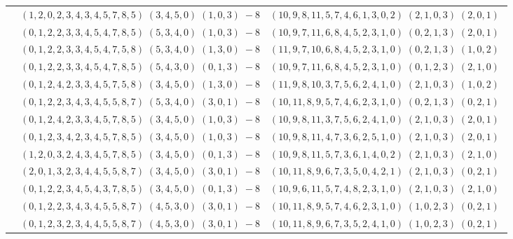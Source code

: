 \documentclass[11pt]{article}
\begin{document}
\begin{longtable}[l]{|c|c|c|}
 \cline{2-3} 
 & $(1 ,2 ,0 ,2 ,3 ,4 ,3 ,4 ,5 ,7 ,8 ,5) \;(3 ,4 ,5 ,0) \;(1 ,0 ,3) \;-8$ & $(10 ,9 ,8 ,11 ,5 ,7 ,4 ,6 ,1 ,3 ,0 ,2) \;(2 ,1 ,0 ,3) \;(2 ,0 ,1) \;$\\ 
 \cline{2-3} 
 & $(0 ,1 ,2 ,2 ,3 ,3 ,4 ,5 ,4 ,7 ,8 ,5) \;(5 ,3 ,4 ,0) \;(1 ,0 ,3) \;-8$ & $(10 ,9 ,7 ,11 ,6 ,8 ,4 ,5 ,2 ,3 ,1 ,0) \;(0 ,2 ,1 ,3) \;(2 ,0 ,1) \;$\\ 
 \cline{2-3} 
 & $(0 ,1 ,2 ,2 ,3 ,3 ,4 ,5 ,4 ,7 ,5 ,8) \;(5 ,3 ,4 ,0) \;(1 ,3 ,0) \;-8$ & $(11 ,9 ,7 ,10 ,6 ,8 ,4 ,5 ,2 ,3 ,1 ,0) \;(0 ,2 ,1 ,3) \;(1 ,0 ,2) \;$\\ 
 \cline{2-3} 
 & $(0 ,1 ,2 ,2 ,3 ,3 ,4 ,5 ,4 ,7 ,8 ,5) \;(5 ,4 ,3 ,0) \;(0 ,1 ,3) \;-8$ & $(10 ,9 ,7 ,11 ,6 ,8 ,4 ,5 ,2 ,3 ,1 ,0) \;(0 ,1 ,2 ,3) \;(2 ,1 ,0) \;$\\ 
 \cline{2-3} 
 & $(0 ,1 ,2 ,4 ,2 ,3 ,3 ,4 ,5 ,7 ,5 ,8) \;(3 ,4 ,5 ,0) \;(1 ,3 ,0) \;-8$ & $(11 ,9 ,8 ,10 ,3 ,7 ,5 ,6 ,2 ,4 ,1 ,0) \;(2 ,1 ,0 ,3) \;(1 ,0 ,2) \;$\\ 
 \cline{2-3} 
 & $(0 ,1 ,2 ,2 ,3 ,4 ,3 ,4 ,5 ,5 ,8 ,7) \;(5 ,3 ,4 ,0) \;(3 ,0 ,1) \;-8$ & $(10 ,11 ,8 ,9 ,5 ,7 ,4 ,6 ,2 ,3 ,1 ,0) \;(0 ,2 ,1 ,3) \;(0 ,2 ,1) \;$\\ 
 \cline{2-3} 
 & $(0 ,1 ,2 ,4 ,2 ,3 ,3 ,4 ,5 ,7 ,8 ,5) \;(3 ,4 ,5 ,0) \;(1 ,0 ,3) \;-8$ & $(10 ,9 ,8 ,11 ,3 ,7 ,5 ,6 ,2 ,4 ,1 ,0) \;(2 ,1 ,0 ,3) \;(2 ,0 ,1) \;$\\ 
 \cline{2-3} 
 & $(0 ,1 ,2 ,3 ,4 ,2 ,3 ,4 ,5 ,7 ,8 ,5) \;(3 ,4 ,5 ,0) \;(1 ,0 ,3) \;-8$ & $(10 ,9 ,8 ,11 ,4 ,7 ,3 ,6 ,2 ,5 ,1 ,0) \;(2 ,1 ,0 ,3) \;(2 ,0 ,1) \;$\\ 
 \cline{2-3} 
 & $(1 ,2 ,0 ,3 ,2 ,4 ,3 ,4 ,5 ,7 ,8 ,5) \;(3 ,4 ,5 ,0) \;(0 ,1 ,3) \;-8$ & $(10 ,9 ,8 ,11 ,5 ,7 ,3 ,6 ,1 ,4 ,0 ,2) \;(2 ,1 ,0 ,3) \;(2 ,1 ,0) \;$\\ 
 \cline{2-3} 
 & $(2 ,0 ,1 ,3 ,2 ,3 ,4 ,4 ,5 ,5 ,8 ,7) \;(3 ,4 ,5 ,0) \;(3 ,0 ,1) \;-8$ & $(10 ,11 ,8 ,9 ,6 ,7 ,3 ,5 ,0 ,4 ,2 ,1) \;(2 ,1 ,0 ,3) \;(0 ,2 ,1) \;$\\ 
 \cline{2-3} 
 & $(0 ,1 ,2 ,2 ,3 ,4 ,5 ,4 ,3 ,7 ,8 ,5) \;(3 ,4 ,5 ,0) \;(0 ,1 ,3) \;-8$ & $(10 ,9 ,6 ,11 ,5 ,7 ,4 ,8 ,2 ,3 ,1 ,0) \;(2 ,1 ,0 ,3) \;(2 ,1 ,0) \;$\\ 
 \cline{2-3} 
 & $(0 ,1 ,2 ,2 ,3 ,4 ,3 ,4 ,5 ,5 ,8 ,7) \;(4 ,5 ,3 ,0) \;(3 ,0 ,1) \;-8$ & $(10 ,11 ,8 ,9 ,5 ,7 ,4 ,6 ,2 ,3 ,1 ,0) \;(1 ,0 ,2 ,3) \;(0 ,2 ,1) \;$\\ 
 \cline{2-3} 
 & $(0 ,1 ,2 ,3 ,2 ,3 ,4 ,4 ,5 ,5 ,8 ,7) \;(4 ,5 ,3 ,0) \;(3 ,0 ,1) \;-8$ & $(10 ,11 ,8 ,9 ,6 ,7 ,3 ,5 ,2 ,4 ,1 ,0) \;(1 ,0 ,2 ,3) \;(0 ,2 ,1) \;$\\ 

\end{longtable}
\end{document}
